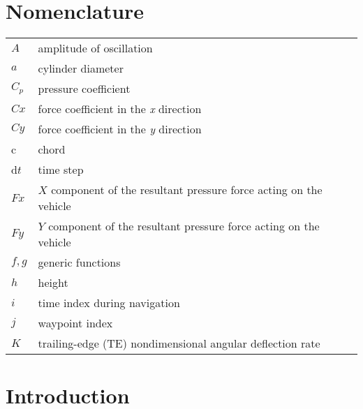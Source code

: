 \section{Nomenclature}

 {\renewcommand\arraystretch{1.0}
  \noindent\begin{longtable*}{@{}l @{\quad=\quad} l@{}}
	  $A$  & amplitude of oscillation \\
	  $a$ &    cylinder diameter \\
	  $C_p$& pressure coefficient \\
	  $Cx$ & force coefficient in the \textit{x} direction \\
	  $Cy$ & force coefficient in the \textit{y} direction \\
	  c   & chord \\
	  d$t$ & time step \\
	  $Fx$ & $X$ component of the resultant pressure force acting on the vehicle \\
	  $Fy$ & $Y$ component of the resultant pressure force acting on the vehicle \\
	  $f, g$   & generic functions \\
	  $h$  & height \\
	  $i$  & time index during navigation \\
	  $j$  & waypoint index \\
	  $K$  & trailing-edge (TE) nondimensional angular deflection rate
  \end{longtable*}}

\section{Introduction}
